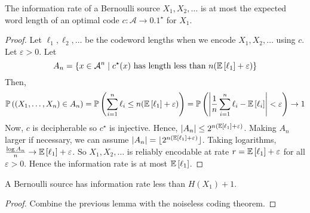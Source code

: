 \begin{lemma}
    The information rate of a Bernoulli source \( X_1, X_2, \dots \) is at most the expected word length of an optimal code \( c \colon \mathcal A \to \qty{0,1}^\star \) for \( X_1 \).
\end{lemma}
\begin{proof}
    Let \( \ell_1, \ell_2, \dots \) be the codeword lengths when we encode \( X_1, X_2, \dots \) using \( c \).
    Let \( \varepsilon > 0 \).
    Let
    \[ A_n = \qty{x \in \mathcal A^n \mid c^\star(x) \text{ has length less than } n \qty(\mathbb{E}\left[{\ell_1}\right] + \varepsilon)} \]
    Then,
    \[ \mathbb{P}\left({(X_1, \dots, X_n) \in A_n}\right) = \mathbb{P}\left({\sum_{i=1}^n \ell_i \leq n \qty(\mathbb{E}\left[{\ell_1}\right] + \varepsilon)}\right) = \mathbb{P}\left({\abs{\frac{1}{n} \sum_{i=1}^n \ell_i - \mathbb{E}\left[{\ell_i}\right]} < \varepsilon}\right) \to 1 \]
    Now, \( c \) is decipherable so \( c^\star \) is injective.
    Hence, \( \abs{A_n} \leq 2^{n\qty(\mathbb{E}\left[{\ell_1}\right] + \varepsilon)} \).
    Making \( A_n \) larger if necessary, we can assume \( \abs{A_n} = \lfloor2^{n\qty(\mathbb{E}\left[{\ell_1}\right] + \varepsilon)}\rfloor \).
    Taking logarithms, \( \frac{\log A_n}{n} \to \mathbb{E}\left[{\ell_1}\right] + \varepsilon \).
    So \( X_1, X_2, \dots \) is reliably encodable at rate \( r = \mathbb{E}\left[{\ell_1}\right] + \varepsilon \) for all \( \varepsilon > 0 \).
    Hence the information rate is at most \( \mathbb{E}\left[{\ell_1}\right] \).
\end{proof}
\begin{corollary}
    A Bernoulli source has information rate less than \( H(X_1) + 1 \).
\end{corollary}
\begin{proof}
    Combine the previous lemma with the noiseless coding theorem.
\end{proof}

